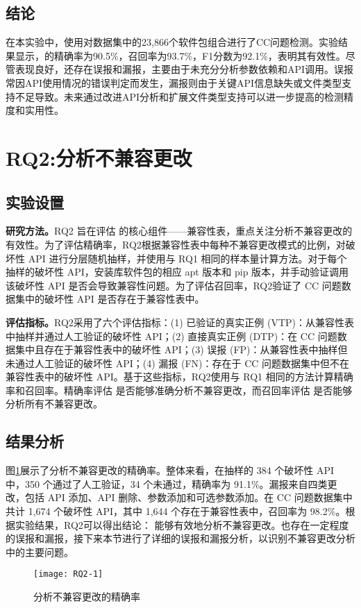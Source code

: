 \subsection{结论}
在本实验中，使用\tool{}对数据集中的23,866个软件包组合进行了CC问题检测。实验结果显示，\tool{}的精确率为90.5\%，召回率为93.7\%，F1分数为92.1\%，表明其有效性。尽管表现良好，\tool{}还存在误报和漏报，主要由于未充分分析参数依赖和API调用。误报常因API使用情况的错误判定而发生，漏报则由于关键API信息缺失或文件类型支持不足导致。未来通过改进API分析和扩展文件类型支持可以进一步提高\tool{}的检测精度和实用性。

\section{RQ2:分析不兼容更改}
\subsection{实验设置}
\textbf{研究方法。}RQ2 旨在评估 \tool{} 的核心组件——兼容性表，重点关注分析不兼容更改的有效性。为了评估精确率，RQ2根据兼容性表中每种不兼容更改模式的比例，对破坏性 API 进行分层随机抽样，并使用与 RQ1 相同的样本量计算方法。对于每个抽样的破坏性 API，安装库软件包的相应 apt 版本和 pip 版本，并手动验证调用该破坏性 API 是否会导致兼容性问题。为了评估召回率，RQ2验证了 CC 问题数据集中的破坏性 API 是否存在于兼容性表中。

\textbf{评估指标。}RQ2采用了六个评估指标：(1) 已验证的真实正例 (VTP)：从兼容性表中抽样并通过人工验证的破坏性 API；(2) 直接真实正例 (DTP)：在 CC 问题数据集中且存在于兼容性表中的破坏性 API；(3) 误报 (FP)：从兼容性表中抽样但未通过人工验证的破坏性 API；(4) 漏报 (FN)：存在于 CC 问题数据集中但不在兼容性表中的破坏性 API。基于这些指标，RQ2使用与 RQ1 相同的方法计算精确率和召回率。精确率评估 \tool{} 是否能够准确分析不兼容更改，而召回率评估 \tool{} 是否能够分析所有不兼容更改。
\subsection{结果分析}
图\ref{fig:RQ5-1}展示了\tool{}分析不兼容更改的精确率。整体来看，在抽样的 384 个破坏性 API 中，350 个通过了人工验证，34 个未通过，精确率为 91.1\%。漏报来自四类更改，包括 API 添加、API 删除、参数添加和可选参数添加。在 CC 问题数据集中共计 1,674 个破坏性 API，其中 1,644 个存在于兼容性表中，召回率为 98.2\%。根据实验结果，RQ2可以得出结论：\tool{} 能够有效地分析不兼容更改。\tool{}也存在一定程度的误报和漏报，接下来本节进行了详细的误报和漏报分析，以识别不兼容更改分析中的主要问题。
\begin{figure}[htbp]
	\centering
	\texttt{[image: RQ2-1]}
	\label{fig:RQ5-1}
	\caption{\tool{}分析不兼容更改的精确率}
\end{figure}

